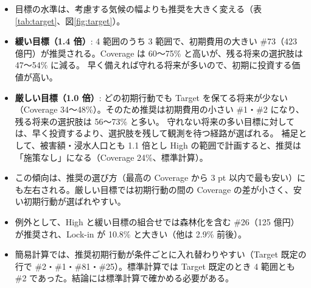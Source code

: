 \documentclass[a4paper,10pt]{ltjsarticle}
\begin{document}
\begin{itemize}
  \item 目標の水準は、考慮する気候の幅よりも推奨を大きく変える（表\ref{tab:target}、図\ref{fig:target}）。
  \item \textbf{緩い目標（1.4 倍）}: 4 範囲のうち 3 範囲で、初期費用の大きい \#73（423 億円）が推奨される。Coverage は 60〜75\% と高いが、残る将来の選択肢は 47〜54\% に減る。
    早く備えれば守れる将来が多いので、初期に投資する価値が高い。
  \item \textbf{厳しい目標（1.0 倍）}: どの初期行動でも Target を保てる将来が少ない（Coverage 34〜48\%）。そのため推奨は初期費用の小さい \#1・\#2 になり、残る将来の選択肢は 56〜73\% と多い。
    守れない将来の多い目標に対しては、早く投資するより、選択肢を残して観測を待つ経路が選ばれる。
    補足として、被害額・浸水人口とも 1.1 倍とし High の範囲で計画すると、推奨は「施策なし」になる（Coverage 24\%、標準計算）。
  \item この傾向は、推奨の選び方（最高の Coverage から 3 pt 以内で最も安い）にも左右される。厳しい目標では初期行動の間の Coverage の差が小さく、安い初期行動が選ばれやすい。
  \item 例外として、High と緩い目標の組合せでは森林化を含む \#26（125 億円）が推奨され、Lock-in が 10.8\% と大きい（他は 2.9\% 前後）。
  \item 簡易計算では、推奨初期行動が条件ごとに入れ替わりやすい（Target 既定の行で \#2・\#1・\#81・\#25）。標準計算では Target 既定のとき 4 範囲とも \#2 であった。結論には標準計算で確かめる必要がある。
\end{itemize}
\end{document}
